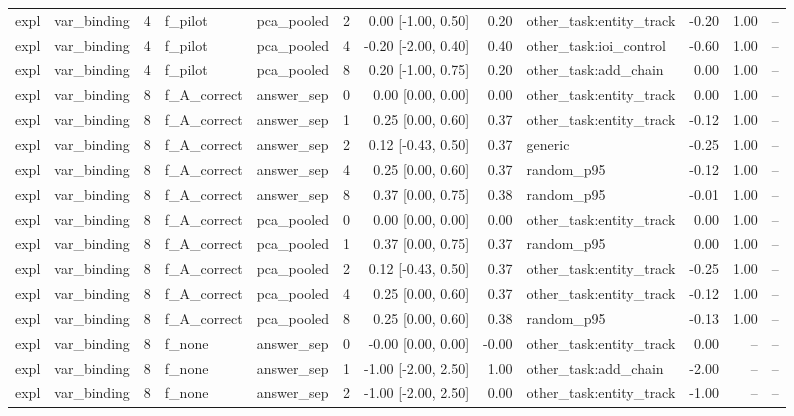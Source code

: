 \begin{tabular}{llrllrrrlrrr}
expl & var\_binding & 4 & f\_pilot & pca\_pooled & 2 & 0.00 [-1.00, 0.50] & 0.20 & other\_task:entity\_track & -0.20 & 1.00 & -- \\
expl & var\_binding & 4 & f\_pilot & pca\_pooled & 4 & -0.20 [-2.00, 0.40] & 0.40 & other\_task:ioi\_control & -0.60 & 1.00 & -- \\
expl & var\_binding & 4 & f\_pilot & pca\_pooled & 8 & 0.20 [-1.00, 0.75] & 0.20 & other\_task:add\_chain & 0.00 & 1.00 & -- \\
expl & var\_binding & 8 & f\_A\_correct & answer\_sep & 0 & 0.00 [0.00, 0.00] & 0.00 & other\_task:entity\_track & 0.00 & 1.00 & -- \\
expl & var\_binding & 8 & f\_A\_correct & answer\_sep & 1 & 0.25 [0.00, 0.60] & 0.37 & other\_task:entity\_track & -0.12 & 1.00 & -- \\
expl & var\_binding & 8 & f\_A\_correct & answer\_sep & 2 & 0.12 [-0.43, 0.50] & 0.37 & generic & -0.25 & 1.00 & -- \\
expl & var\_binding & 8 & f\_A\_correct & answer\_sep & 4 & 0.25 [0.00, 0.60] & 0.37 & random\_p95 & -0.12 & 1.00 & -- \\
expl & var\_binding & 8 & f\_A\_correct & answer\_sep & 8 & 0.37 [0.00, 0.75] & 0.38 & random\_p95 & -0.01 & 1.00 & -- \\
expl & var\_binding & 8 & f\_A\_correct & pca\_pooled & 0 & 0.00 [0.00, 0.00] & 0.00 & other\_task:entity\_track & 0.00 & 1.00 & -- \\
expl & var\_binding & 8 & f\_A\_correct & pca\_pooled & 1 & 0.37 [0.00, 0.75] & 0.37 & random\_p95 & 0.00 & 1.00 & -- \\
expl & var\_binding & 8 & f\_A\_correct & pca\_pooled & 2 & 0.12 [-0.43, 0.50] & 0.37 & other\_task:entity\_track & -0.25 & 1.00 & -- \\
expl & var\_binding & 8 & f\_A\_correct & pca\_pooled & 4 & 0.25 [0.00, 0.60] & 0.37 & other\_task:entity\_track & -0.12 & 1.00 & -- \\
expl & var\_binding & 8 & f\_A\_correct & pca\_pooled & 8 & 0.25 [0.00, 0.60] & 0.38 & random\_p95 & -0.13 & 1.00 & -- \\
expl & var\_binding & 8 & f\_none & answer\_sep & 0 & -0.00 [0.00, 0.00] & -0.00 & other\_task:entity\_track & 0.00 & -- & -- \\
expl & var\_binding & 8 & f\_none & answer\_sep & 1 & -1.00 [-2.00, 2.50] & 1.00 & other\_task:add\_chain & -2.00 & -- & -- \\
expl & var\_binding & 8 & f\_none & answer\_sep & 2 & -1.00 [-2.00, 2.50] & 0.00 & other\_task:entity\_track & -1.00 & -- & -- \\

\end{tabular}
